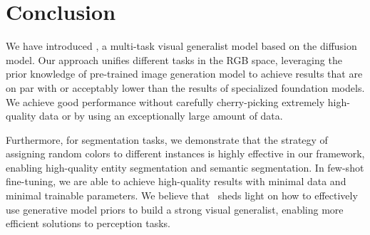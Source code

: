 \section{Conclusion}
We have introduced \ours, a multi-task visual generalist model based on the diffusion model. Our approach unifies different tasks in the RGB space, leveraging the prior knowledge of pre-trained image generation model to achieve results that are on par with or acceptably lower than the results of specialized foundation models.
We achieve good performance without carefully cherry-picking extremely high-quality data or by using an exceptionally large amount of data.

Furthermore, for segmentation tasks, we demonstrate that the strategy of assigning random colors to different instances is highly effective in our framework, enabling high-quality entity segmentation and semantic segmentation. 
In few-shot fine-tuning, we are able to achieve high-quality results with minimal data and minimal trainable parameters. 
We believe that \ours\ sheds light on how to effectively use generative model priors to build a strong visual generalist, enabling more efficient solutions to perception tasks.